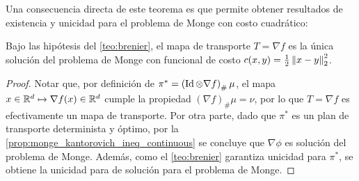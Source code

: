 Una consecuencia directa de este teorema es que permite obtener resultados de existencia y unicidad para el problema de Monge con costo cuadrático:

\begin{cor}
	Bajo las hipótesis del \autoref{teo:brenier}, el mapa de transporte $T=\nabla f$ es la única solución del problema de Monge con funcional de costo $c(x,y)=\frac{1}{2}\left\lVert x-y \right\rVert_2^2$.
\end{cor}

\begin{proof}
	Notar que, por definición de $\pi^* = \left(\operatorname{Id}\otimes \nabla f\right)_\#\mu$, el mapa $x\in\mathbb{R}^d \mapsto \nabla f(x)\in\mathbb{R}^d$ cumple la propiedad $(\nabla f)_\#\mu=\nu$, por lo que $T=\nabla f$ es efectivamente un mapa de transporte. Por otra parte, dado que $\pi^*$ es un plan de transporte determinista y óptimo, por la \autoref{prop:monge_kantorovich_ineq_continuous} se concluye que $\nabla\phi$ es solución del problema de Monge. Además, como el \autoref{teo:brenier} garantiza unicidad para $\pi^*$, se obtiene la unicidad para de solución para el problema de Monge.
\end{proof}






